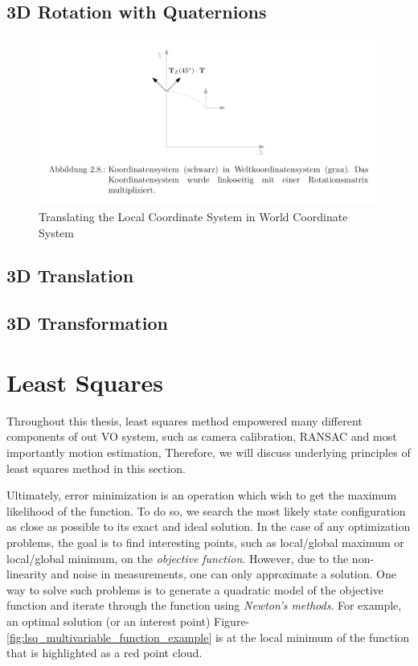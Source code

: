 \documentclass[a4paper]{report}
\numberwithin{figure}{section}
\begin{document}
\subsection{3D Rotation with Quaternions}


\begin{figure}[H]
	\centering
	\includegraphics[width=\linewidth,natwidth=640,natheight=640]
	{fig/ref_imgs/2d_translation.png}
  \caption{Translating the Local Coordinate System in World Coordinate System}
	\label{fig:2d_rotation}
\end{figure}



\subsection{3D Translation}


\subsection{3D Transformation}

\section{Least Squares}\label{sc_least_squares}

Throughout this thesis, least squares method empowered many different components 
of out VO system, 
such as camera calibration, RANSAC and most importantly motion estimation, 
Therefore, we will discuss underlying principles of least squares method in this section.

Ultimately, error minimization is an 
operation which wish to get the maximum likelihood of the function. To do so,
we search the most
likely state configuration as close as possible to its exact and ideal solution. 
In the case of any optimization problems,
the goal is to find interesting points, such as local/global
maximum or local/global minimum, on the \textit{objective}
\textit{function}. However, due to the
non-linearity and noise in measurements, one can only approximate a solution.
One way to solve such problems is to generate a quadratic model of 
the objective function and iterate
through the function using \textit{Newton's methods}. 
For example,
an optimal solution (or an interest point)
Figure-\ref{fig:lsq_multivariable_function_example} is at the local
minimum of the function that is highlighted as a red point cloud.
\end{document}
